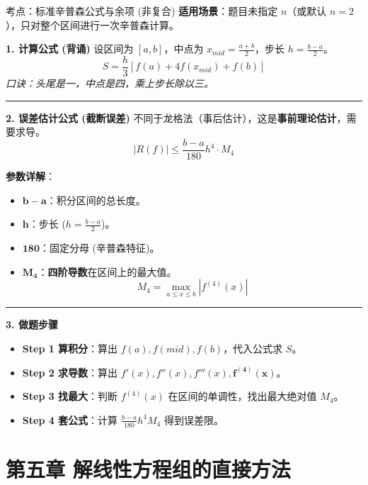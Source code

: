 \documentclass[12pt, a4paper]{article}
\begin{document}
\begin{knowpoint}{考点：标准辛普森公式与余项 (非复合)}
    \textbf{适用场景}：题目未指定 $n$（或默认 $n=2$），只对整个区间进行一次辛普森计算。

    \textbf{1. 计算公式 (背诵)}
    设区间为 $[a, b]$，中点为 $x_{mid} = \frac{a+b}{2}$，步长 $h = \frac{b-a}{2}$。
    \[ S = \frac{h}{3} \left[ f(a) + 4f(x_{mid}) + f(b) \right] \]
    \textit{口诀：头尾是一，中点是四，乘上步长除以三。}

    \vspace{0.5em}
    \hrule
    \vspace{0.5em}

    \textbf{2. 误差估计公式 (截断误差)}
    不同于龙格法（事后估计），这是\textbf{事前理论估计}，需要求导。
    \[ |R(f)| \le \frac{b-a}{180} h^4 \cdot M_4 \]
    
    \textbf{参数详解}：
    \begin{itemize}
        \item $\mathbf{b-a}$：积分区间的总长度。
        \item $\mathbf{h}$：步长 ($h = \frac{b-a}{2}$)。
        \item $\mathbf{180}$：固定分母 (辛普森特征)。
        \item $\mathbf{M_4}$：\textbf{四阶导数}在区间上的最大值。
        \[ M_4 = \max_{a \le x \le b} |f^{(4)}(x)| \]
    \end{itemize}

    \vspace{0.5em}
    \hrule
    \vspace{0.5em}

    \textbf{3. 做题步骤}
    \begin{itemize}
        \item \textbf{Step 1 算积分}：算出 $f(a), f(mid), f(b)$，代入公式求 $S$。
        \item \textbf{Step 2 求导数}：算出 $f'(x), f''(x), f'''(x), \mathbf{f^{(4)}(x)}$。
        \item \textbf{Step 3 找最大}：判断 $f^{(4)}(x)$ 在区间的单调性，找出最大绝对值 $M_4$。
        \item \textbf{Step 4 套公式}：计算 $\frac{b-a}{180} h^4 M_4$ 得到误差限。
    \end{itemize}
\end{knowpoint}

\section*{第五章 解线性方程组的直接方法}
\end{document}
